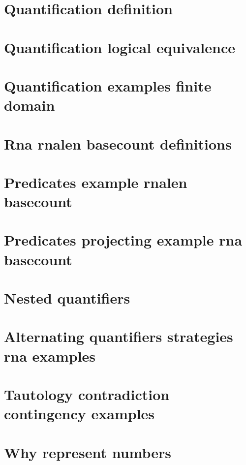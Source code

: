 
\section*{Quantification definition}

\vfill
\section*{Quantification logical equivalence}

\vfill
\section*{Quantification examples finite domain}

\vfill
\section*{Rna rnalen basecount definitions}

\vfill
\section*{Predicates example rnalen basecount}

\vfill
\section*{Predicates projecting example rna basecount}

\vfill
\section*{Nested quantifiers}

\vfill
\section*{Alternating quantifiers strategies rna examples}

\vfill
\section*{Tautology contradiction contingency examples}

\vfill
\section*{Why represent numbers}

\vfill

